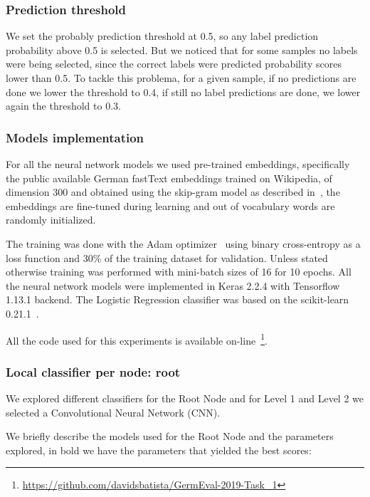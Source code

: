 \documentclass[11pt,a4paper]{article}
\begin{document}
\subsubsection{Prediction threshold}

We set the probably prediction threshold at 0.5, so any label prediction probability
above 0.5 is selected. But we noticed that for some samples no labels were
being selected, since the correct labels were predicted probability scores lower than 0.5.
To tackle this problema, for a given sample, if no predictions are done we lower
the threshold to 0.4, if still no label predictions are done, we lower again
the threshold to 0.3.


\subsubsection{Models implementation}

For all the neural network models we used pre-trained embeddings, specifically
the public available German fastText embeddings trained on Wikipedia, of
dimension 300 and obtained using the skip-gram model as described
in~\citet{bojanowski-etal-2017-enriching}, the embeddings are fine-tuned
during learning and out of vocabulary words are randomly initialized.

The training was done with the Adam optimizer~\cite{journals/corr/KingmaB14}
using binary cross-entropy as a loss function and 30\% of the training
dataset for validation. Unless stated otherwise training was performed with
mini-batch sizes of 16 for 10 epochs. All the neural network models were implemented in
Keras 2.2.4 with Tensorflow 1.13.1 backend. The Logistic Regression classifier
was based on the scikit-learn 0.21.1~\cite{Pedregosa:2011:SML:1953048.2078195}.

All the code used for this experiments is available
on-line~\footnote{\url{https://github.com/davidsbatista/GermEval-2019-Task_1}}.


\subsubsection{Local classifier per node: root}

We explored different classifiers for the Root Node and for Level 1 and Level 2 we
selected a Convolutional Neural Network (CNN).

We briefly describe the models used for the Root Node and the parameters explored,
in bold we have the parameters that yielded the best scores:
\end{document}
